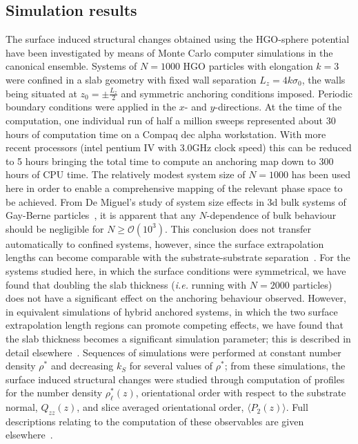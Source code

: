 \documentclass[aps,10pt,twocolumn]{revtex4}
\makeatletter
\newcommand{\ie}{\emph{i.e.}\@\xspace}
\makeatother
\begin{document}
\subsection{Simulation results}
\label{ss:RSPresults} The surface induced structural changes obtained using the HGO-sphere potential have been
investigated by means of Monte Carlo computer simulations in the canonical ensemble. Systems of $N=1000$ HGO
particles with elongation $k=3$ were confined in a slab geometry with fixed wall separation $L_z=4k\sigma_0$, the
walls being situated at $z_0 = \pm\frac{L_z}{2}$ and symmetric anchoring conditions imposed. Periodic boundary
conditions were applied in the $x$- and $y$-directions. 
At the time of the computation, one individual run of half a million sweeps represented about 30
hours of computation time on a Compaq dec alpha workstation. With more recent processors (intel
pentium IV with 3.0GHz clock speed) this can be reduced to 5 hours bringing the total time to
compute an anchoring map down to 300 hours of CPU time.
The relatively modest system size of $N=1000$ has been
used here in order to enable a comprehensive mapping of the relevant phase space to be achieved. From De Miguel's
study of system size effects in 3d bulk systems of Gay-Berne particles~\cite{DeMiguel92}, it is apparent that any
$N$-dependence of bulk behaviour should be negligible for $N\geq\mathcal{O}(10^3)$. This conclusion does not
transfer automatically to confined systems, however, since the surface extrapolation lengths can become comparable
with the substrate-substrate separation~\cite{Priezjev03}. For the systems studied here, in which the surface
conditions were symmetrical, we have found that doubling the slab thickness (\ie running with $N=2000$ particles)
does not have a significant effect on the anchoring behaviour observed. However, in equivalent simulations of
hybrid anchored systems, in which the two surface extrapolation length regions can promote competing effects, we
have found that the slab thickness becomes a significant simulation parameter; this is described in detail
elsewhere~\cite{BarmesCleaver04d}. Sequences of simulations were performed at constant number density $\rho^{*}$
and decreasing $k_S$ for several values of $\rho^{*}$; from these simulations, the surface induced structural
changes were studied through computation of profiles for the number density $\rho^{*}_\ell(z)$, orientational
order with respect to the substrate normal, $Q_{zz}(z)$, and slice averaged orientational order, $\langle
P_2(z)\rangle$. Full descriptions relating to the computation of these observables are given
elsewhere~\cite{WallCleaver97,BarmesCleaver04a}.
\end{document}
